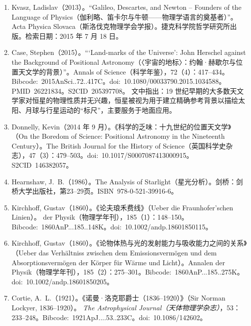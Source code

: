 \begin{enumerate}
  \item Kvasz, Ladislav（2013）。“Galileo, Descartes, and Newton – Founders of the Language of Physics（伽利略、笛卡尔与牛顿——物理学语言的奠基者）”。Acta Physica Slovaca（斯洛伐克物理学会学报）。捷克科学院哲学研究所出版。检索日期：2015 年 7 月 18 日。
  \item Case, Stephen（2015）。“‘Land-marks of the Universe’: John Herschel against the Background of Positional Astronomy（〈宇宙的地标〉：约翰·赫歇尔与位置天文学的背景）”。Annals of Science（科学年鉴），72（4）：417–434。Bibcode:~2015AnSci..72..417C。doi:~10.1080/00033790.2015.1034588。PMID~26221834。S2CID~205397708。  
  文中指出：19 世纪早期的大多数天文学家对恒星的物理性质并无兴趣，恒星被视为用于建立精确参考背景以描绘太阳、月球与行星运动的“标尺”，主要服务于地面应用。
  \item Donnelly, Kevin（2014 年 9 月）。《科学的乏味：十九世纪的位置天文学》（On the Boredom of Science: Positional Astronomy in the Nineteenth Century）。The British Journal for the History of Science（英国科学史杂志），47（3）：479–503。doi:~10.1017/S0007087413000915。S2CID~146382057。
  \item Hearnshaw, J.~B.（1986）。The Analysis of Starlight（星光分析）。剑桥：剑桥大学出版社，第23–29页。ISBN~978-0-521-39916-6。
  \item Kirchhoff, Gustav（1860）。《论夫琅禾费线》（Ueber die Fraunhofer'schen Linien）。  
  \textitAnnalen der Physik（物理学年刊），185（1）：148–150。Bibcode:~1860AnP...185..148K。doi:~10.1002/andp.18601850115。
  \item Kirchhoff, Gustav（1860）。《论物体热与光的发射能力与吸收能力之间的关系》（Ueber das Verhältniss zwischen dem Emissionsvermögen und dem Absorptionsvermögen der Körper für Wärme und Licht）。Annalen der Physik（物理学年刊），185（2）：275–301。Bibcode:~1860AnP...185..275K。doi:~10.1002/andp.18601850205。
  \item Cortie, A.~L.（1921）。《诺曼·洛克耶爵士（1836–1920）》（Sir Norman Lockyer, 1836–1920）。  
  \textit{The Astrophysical Journal（天体物理学杂志）}，53：233–248。Bibcode:~1921ApJ....53..233C。doi:~10.1086/142602。
\end{enumerate}


